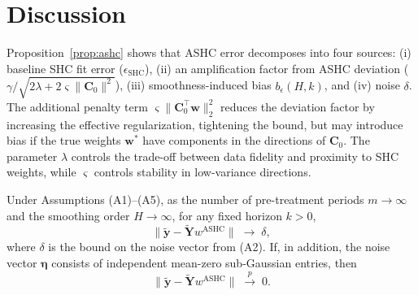 \documentclass{article}
\begin{document}
\section*{Discussion}

Proposition~\ref{prop:ashc} shows that ASHC error decomposes into four sources:
(i) baseline SHC fit error ($\epsilon_{\text{SHC}}$),
(ii) an amplification factor from ASHC deviation ($\gamma/\sqrt{2\lambda + 2\varsigma \|\mathbf{C}_0\|^2}$),
(iii) smoothness-induced bias $b_\epsilon(H,k)$,
and (iv) noise $\delta$.
The additional penalty term $\varsigma \|\mathbf{C}_0^\top \mathbf{w}\|_2^2$ reduces the deviation factor by increasing the effective regularization, tightening the bound, but may introduce bias if the true weights $\mathbf{w}^*$ have components in the directions of $\mathbf{C}_0$. The parameter $\lambda$ controls the trade-off between data fidelity and proximity to SHC weights, while $\varsigma$ controls stability in low-variance directions.

\begin{theorem}
\label{thm:ashc_asymptotics}
Under Assumptions (A1)--(A5), as the number of pre-treatment periods $m \to \infty$
and the smoothing order $H \to \infty$, for any fixed horizon $k > 0$,
\[
\|\widetilde{\mathbf{y}} - \widetilde{\mathbf{Y}} w^{\text{ASHC}}\|
\;\longrightarrow\; \delta,
\]
where $\delta$ is the bound on the noise vector from (A2).
If, in addition, the noise vector $\bm{\eta}$ consists of independent mean-zero 
sub-Gaussian entries, then
\[
\|\widetilde{\mathbf{y}} - \widetilde{\mathbf{Y}} w^{\text{ASHC}}\|
\;\xrightarrow{p}\; 0.
\]
\end{theorem}
\end{document}
